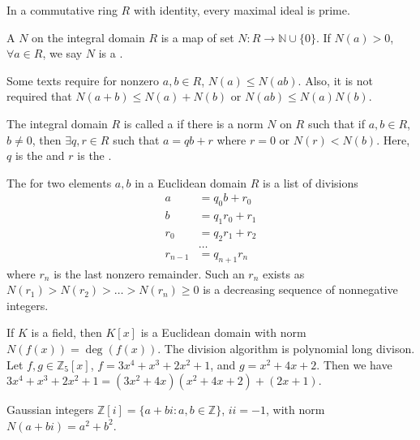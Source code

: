 \documentclass{mathnotes}
\begin{document}
\begin{prop}
  In a commutative ring $R$ with identity, every maximal ideal is prime.
\end{prop}

\begin{defi}
  A  $N$ on the integral domain $R$ is a map of set
  $N:R\to\mathbb{N}\cup\{0\}$. If $N(a)>0$, $\forall a\in R$, we say $N$ is a
  .
\end{defi}

\begin{note}
  Some texts require for nonzero $a,b\in R$, $N(a)\le N(ab)$. Also, it is not
  required that $N(a+b)\le N(a)+N(b)$ or $N(ab)\le N(a)N(b)$.
\end{note}

\begin{defi}
  The integral domain $R$ is called a  if there is a
  norm $N$ on $R$ such that if $a,b\in R$, $b\neq 0$, then $\exists q,r\in R$
  such that $a=qb+r$ where $r=0$ or $N(r)<N(b)$. Here, $q$ is the
   and $r$ is the .
\end{defi}

\begin{defi}
  The  for two elements $a,b$ in a Euclidean domain
  $R$ is a list of divisions
  \begin{align*}
    a&=q_0b+r_0\\
    b&=q_1r_0+r_1\\
    r_0&=q_2r_1+r_2\\
       &\ldots\\
    r_{n-1}&=q_{n+1}r_n
  \end{align*}
  where $r_n$ is the last nonzero remainder. Such an $r_n$ exists as
  $N(r_1)>N(r_2)>\ldots>N(r_n)\ge0$ is a decreasing sequence of nonnegative
  integers.
\end{defi}

\begin{ex}
  If $K$ is a field, then $K[x]$ is a Euclidean domain with norm
  $N(f(x))=\deg(f(x))$. The division algorithm is polynomial long divison. Let
  $f,g\in\mathbb{Z}_5[x]$, $f=3x^4+x^3+2x^2+1$, and $g=x^2+4x+2$. Then we have
  $3x^4+x^3+2x^2+1=(3x^2+4x)(x^2+4x+2)+(2x+1)$.
\end{ex}

\begin{ex}
  Gaussian integers $\mathbb{Z}[i]=\{a+bi:a,b\in \mathbb{Z}\}$, $ii=-1$, with
  norm $N(a+bi)=a^2+b^2$.
\end{ex}
\end{document}
